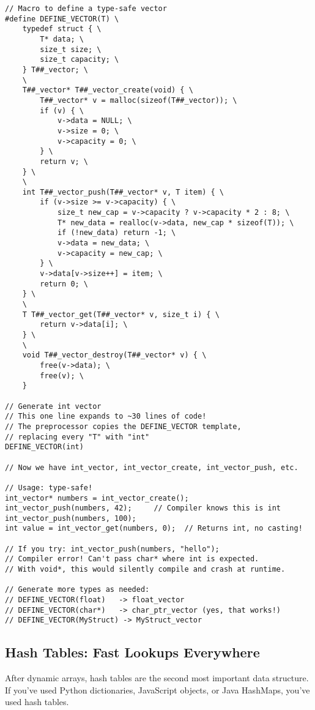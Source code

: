 \begin{lstlisting}
// Macro to define a type-safe vector
#define DEFINE_VECTOR(T) \
    typedef struct { \
        T* data; \
        size_t size; \
        size_t capacity; \
    } T##_vector; \
    \
    T##_vector* T##_vector_create(void) { \
        T##_vector* v = malloc(sizeof(T##_vector)); \
        if (v) { \
            v->data = NULL; \
            v->size = 0; \
            v->capacity = 0; \
        } \
        return v; \
    } \
    \
    int T##_vector_push(T##_vector* v, T item) { \
        if (v->size >= v->capacity) { \
            size_t new_cap = v->capacity ? v->capacity * 2 : 8; \
            T* new_data = realloc(v->data, new_cap * sizeof(T)); \
            if (!new_data) return -1; \
            v->data = new_data; \
            v->capacity = new_cap; \
        } \
        v->data[v->size++] = item; \
        return 0; \
    } \
    \
    T T##_vector_get(T##_vector* v, size_t i) { \
        return v->data[i]; \
    } \
    \
    void T##_vector_destroy(T##_vector* v) { \
        free(v->data); \
        free(v); \
    }

// Generate int vector
// This one line expands to ~30 lines of code!
// The preprocessor copies the DEFINE_VECTOR template,
// replacing every "T" with "int"
DEFINE_VECTOR(int)

// Now we have int_vector, int_vector_create, int_vector_push, etc.

// Usage: type-safe!
int_vector* numbers = int_vector_create();
int_vector_push(numbers, 42);     // Compiler knows this is int
int_vector_push(numbers, 100);
int value = int_vector_get(numbers, 0);  // Returns int, no casting!

// If you try: int_vector_push(numbers, "hello");
// Compiler error! Can't pass char* where int is expected.
// With void*, this would silently compile and crash at runtime.

// Generate more types as needed:
// DEFINE_VECTOR(float)   -> float_vector
// DEFINE_VECTOR(char*)   -> char_ptr_vector (yes, that works!)
// DEFINE_VECTOR(MyStruct) -> MyStruct_vector
\end{lstlisting}

\subsection{Hash Tables: Fast Lookups Everywhere}

After dynamic arrays, hash tables are the second most important data structure. If you've used Python dictionaries, JavaScript objects, or Java HashMaps, you've used hash tables.


